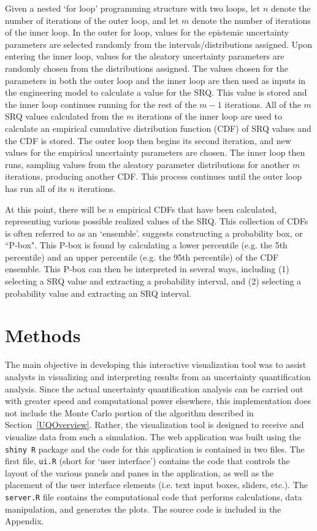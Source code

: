 \documentclass[11pt]{asaproc}\usepackage[]{graphicx}\usepackage[]{color}
\begin{document}
Given a nested `for loop' programming structure with two loops, let $n$ denote the number of iterations of the outer loop, and let $m$ denote the number of iterations of the inner loop. In the outer for loop, values for the epistemic uncertainty parameters are selected randomly from the intervals/distributions assigned. Upon entering the inner loop, values for the aleatory uncertainty parameters are randomly chosen from the distributions assigned. The values chosen for the parameters in both the outer loop and the inner loop are then used as inputs in the engineering model to calculate a value for the SRQ. This value is stored and the inner loop continues running for the rest of the $m-1$ iterations. All of the $m$ SRQ values calculated from the $m$ iterations of the inner loop are used to calculate an empirical cumulative distribution function (CDF) of SRQ values and the CDF is stored. The outer loop then begins its second iteration, and new values for the empirical uncertainty parameters are chosen. The inner loop then runs, sampling values from the aleatory parameter distributions for another $m$ iterations, producing another CDF. This process continues until the outer loop has run all of its $n$ iterations. 

At this point, there will be $n$ empirical CDFs that have been calculated, representing various possible realized values of the SRQ. This collection of CDFs is often referred to as an `ensemble'.  \cite{EW2018} suggests constructing a probability box, or ``P-box". This P-box is found by calculating a lower percentile (e.g. the 5th percentile) and an upper percentile (e.g. the 95th percentile) of the CDF ensemble. This P-box can then be interpreted in several ways, including (1) selecting a SRQ value and extracting a probability interval, and (2) selecting a probability value and extracting an SRQ interval.

\section{Methods}  
\label{Methods}

The main objective in developing this interactive visualization tool was to assist analysts in visualizing and interpreting results from an uncertainty quantification analysis. Since the actual uncertainty quantification analysis can be carried out with greater speed and computational power elsewhere, this implementation does not include the Monte Carlo portion of the algorithm described in Section~\ref{UQOverview}. Rather, the visualization tool is designed to receive and visualize data from such a simulation. The web application was built using the {\tt shiny R} package \citep{SHINY} and the code for this application is contained in two files. The first file, {\tt ui.R} (short for `user interface') contains the code that controls the layout of the various panels and panes in the application, as well as the placement of the user interface elements (i.e. text input boxes, sliders, etc.). The {\tt server.R} file contains the computational code that performs calculations, data manipulation, and generates the plots. The source code is included in the Appendix.
\end{document}
